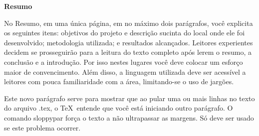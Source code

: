 
\begin{center}
\huge{{\bf Resumo}}
\vspace{2cm}
\end{center}

No Resumo, em uma única página, em no máximo dois parágrafos, você explicita os seguintes itens: objetivos do projeto e descrição sucinta do local onde ele foi desenvolvido; metodologia utilizada; e resultados alcançados. Leitores experientes decidem se prosseguirão para a leitura do texto completo após lerem o resumo, a conclusão e a introdução. Por isso nestes lugares você deve colocar um esforço maior de convencimento. Além disso, a linguagem utilizada deve ser acessível a leitores com pouca familiaridade com a área, limitando-se o uso de jargões.
 
\begin{sloppypar}
Este novo parágrafo serve para mostrar que ao pular uma ou mais linhas no texto do arquivo .tex, o \TeX\ entende que você está iniciando outro parágrafo. O comando \textsf{sloppypar} força o texto a não ultrapassar as margens. Só deve ser usado se este problema ocorrer.
\end{sloppypar}

 
\clearpage
\thispagestyle{empty}
\cleardoublepage

